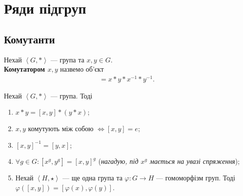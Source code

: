 \documentclass{math_library}
\begin{document}

\section{Ряди підгруп}
\subsection{Комутанти}
\begin{definition}
Нехай $\left<G,*\right>$ --- група та $x,y \in G$.\\
\textbf{Комутатором $x,y$} назвемо об'єкт
\begin{align*}
[x,y] = x*y*x^{-1}*y^{-1}.
\end{align*}
\end{definition}

\begin{proposition}
Нехай $\left< G,* \right>$ --- група. Тоді
\begin{enumerate}[nosep,wide=0pt,label={\arabic*)}]
\item $x*y = [x,y]*(y*x)$;
\item $x,y$ комутують між собою $\iff [x,y] = e$;
\item $[x,y]^{-1} = [y,x]$;
\item $\forall g \in G: [x^g,y^g] = [x,y]^g$ (\textit{нагадую, під $x^g$ мається на увазі спряження});
\item Нехай $\left< H,\star\right>$ --- ще одна група та $\varphi \colon G \to H$ --- гомоморфізм груп. Тоді $\varphi([x,y]) = [\varphi(x),\varphi(y)]$.
\end{enumerate}
\end{proposition}
\end{document}

